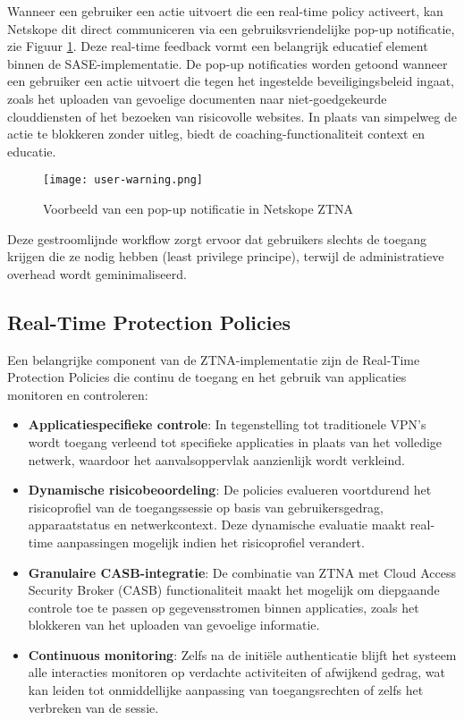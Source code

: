 Wanneer een gebruiker een actie uitvoert die een real-time policy activeert, kan Netskope dit direct communiceren via een gebruiksvriendelijke pop-up notificatie, zie Figuur \ref{fig:user-alert}. Deze real-time feedback vormt een belangrijk educatief element binnen de SASE-implementatie.
De pop-up notificaties worden getoond wanneer een gebruiker een actie uitvoert die tegen het ingestelde beveiligingsbeleid ingaat, zoals het uploaden van gevoelige documenten naar niet-goedgekeurde clouddiensten of het bezoeken van risicovolle websites. In plaats van simpelweg de actie te blokkeren zonder uitleg, biedt de coaching-functionaliteit context en educatie.
\begin{figure}[h!]
    \centering
    \texttt{[image: user-warning.png]}
    \caption[]{Voorbeeld van een pop-up notificatie in Netskope ZTNA}
    \label{fig:user-alert}
\end{figure}

Deze gestroomlijnde workflow zorgt ervoor dat gebruikers slechts de toegang krijgen die ze nodig hebben (least privilege principe), terwijl de administratieve overhead wordt geminimaliseerd.

\subsection{Real-Time Protection Policies}

Een belangrijke component van de ZTNA-implementatie zijn de Real-Time Protection Policies die continu de toegang en het gebruik van applicaties monitoren en controleren:

\begin{itemize}
    \item \textbf{Applicatiespecifieke controle}: In tegenstelling tot traditionele VPN's wordt toegang verleend tot specifieke applicaties in plaats van het volledige netwerk, waardoor het aanvalsoppervlak aanzienlijk wordt verkleind.

    \item \textbf{Dynamische risicobeoordeling}: De policies evalueren voortdurend het risicoprofiel van de toegangssessie op basis van gebruikersgedrag, apparaatstatus en netwerkcontext. Deze dynamische evaluatie maakt real-time aanpassingen mogelijk indien het risicoprofiel verandert.

    \item \textbf{Granulaire CASB-integratie}: De combinatie van ZTNA met Cloud Access Security Broker (CASB) functionaliteit maakt het mogelijk om diepgaande controle toe te passen op gegevensstromen binnen applicaties, zoals het blokkeren van het uploaden van gevoelige informatie.

    \item \textbf{Continuous monitoring}: Zelfs na de initiële authenticatie blijft het systeem alle interacties monitoren op verdachte activiteiten of afwijkend gedrag, wat kan leiden tot onmiddellijke aanpassing van toegangsrechten of zelfs het verbreken van de sessie.
\end{itemize}

